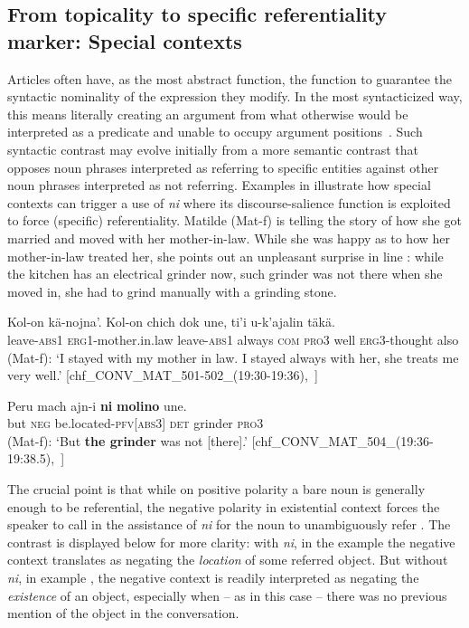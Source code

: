 \documentclass[output=paper
,modfonts
,nonflat]{langsci/langscibook}
\begin{document}
\subsection{From topicality to specific referentiality marker: Special contexts}\label{sec:pico:4.3}\largerpage

Articles often have, as the most abstract function, the function to guarantee the syntactic nominality of the expression they modify. In the most syntacticized way, this means literally creating an argument from what otherwise would be interpreted as a predicate and unable to occupy argument positions~\citep[176]{Gillon2015}. Such syntactic contrast may evolve initially from a more semantic contrast that opposes noun phrases interpreted as referring to specific entities against other noun phrases interpreted as not referring.
Examples in  illustrate how special contexts can trigger a use of \textit{ni} where its discourse-salience function is exploited to force (specific) referentiality. Matilde (Mat-f) is telling the story of how she got married and moved with her mother-in-law. While she was happy as to how her mother-in-law treated her, she points out an unpleasant surprise in line : while the kitchen has an electrical grinder now, such grinder was not there when she moved in, she had to grind manually with a grinding stone.


\ea \label{ex:pico:56}

\ea \label{ex:pico:56a}
\gll Kol-on kä-nojna'. Kol-on chich dok une, ti'i u-k'ajalin täkä.\\
leave-{\textsc{abs1}} {\textsc{erg1}}-mother.in.law leave-{\textsc{abs1}} always {\textsc{com}} \textsc{pro3} well {\textsc{erg3}}-thought also\\
\glt (Mat-f): `I stayed with my mother in law. I stayed always with her, she treats me very well.' [chf\_CONV\_MAT\_501-502\_(19:30-19:36),~\citealt{Delgado-Galvan2018archive}]

\ex \label{ex:pico:56b}
\gll Peru mach ajn-i \textbf{ni} \textbf{molino} une.
\\
but \textsc{neg} be.located-{\textsc{pfv[abs3]}} \textsc{det} grinder {\textsc{pro3}}\\
\glt (Mat-f): `But \textbf{the grinder} was not [there].' [chf\_CONV\_MAT\_504\_(19:36-19:38.5),~\citealt{Delgado-Galvan2018archive}]
\z
\z

The crucial point is that while on positive polarity a bare noun is generally enough to be referential, the negative polarity in existential context forces the speaker to call in the assistance of \textit{ni} for the noun to unambiguously refer . The contrast is displayed below for more clarity: with \textit{ni}, in the example  the negative context translates as negating the \textit{location} of some referred object. But without \textit{ni}, in example , the negative context is readily interpreted as negating the \textit{existence} of an object, especially when -- as in this case -- there was no previous mention of the object in the conversation.\largerpage[2]
\end{document}
